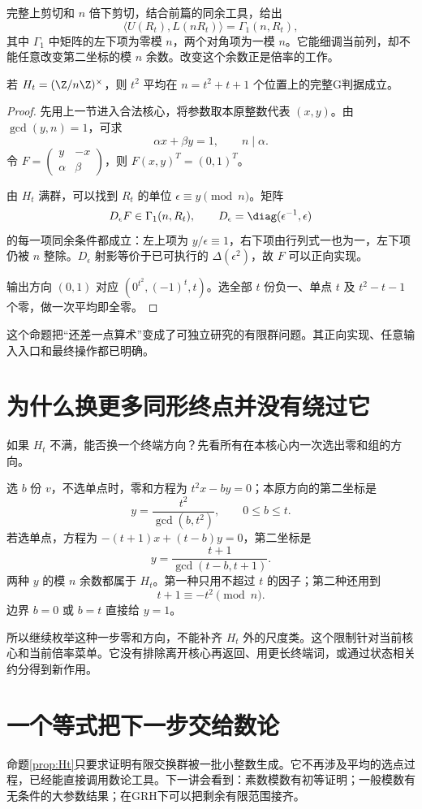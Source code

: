 完整上剪切和 $n$ 倍下剪切，结合前篇的同余工具，给出
\[\langle U(R_t),L(nR_t)\rangle=\Gamma_1(n,R_t),
\]
其中 $\Gamma_1$ 中矩阵的左下项为零模 $n$，两个对角项为一模 $n$。它能细调当前列，却不能任意改变第二坐标的模 $n$ 余数。改变这个余数正是倍率的工作。

\begin{proposition}[平方族的充分算术接口]\label{prop:Ht}
若 $H_t=(\Z/n\Z)^\times$，则 $t^2$ 平均在 $n=t^2+t+1$ 个位置上的完整G判据成立。
\end{proposition}
\begin{proof}
先用上一节进入合法核心，将参数取本原整数代表 $(x,y)$。由 $\gcd(y,n)=1$，可求
\[\alpha x+\beta y=1,\qquad n\mid\alpha.
\]
令 $F=\left(\begin{smallmatrix}y&-x\\\alpha&\beta\end{smallmatrix}\right)$，则 $F(x,y)^T=(0,1)^T$。

由 $H_t$ 满群，可以找到 $R_t$ 的单位 $\epsilon\equiv y\pmod n$。矩阵
\[D_\epsilon F\in\Gamma_1(n,R_t),\qquad
D_\epsilon=\diag(\epsilon^{-1},\epsilon)
\]
的每一项同余条件都成立：左上项为 $y/\epsilon\equiv1$，右下项由行列式一也为一，左下项仍被 $n$ 整除。$D_\epsilon$ 射影等价于已可执行的 $\Delta(\epsilon^2)$，故 $F$ 可以正向实现。

输出方向 $(0,1)$ 对应 $(0^{t^2},(-1)^t,t)$。选全部 $t$ 份负一、单点 $t$ 及 $t^2-t-1$ 个零，做一次平均即全零。
\end{proof}

这个命题把“还差一点算术”变成了可独立研究的有限群问题。其正向实现、任意输入入口和最终操作都已明确。

\section{为什么换更多同形终点并没有绕过它}
如果 $H_t$ 不满，能否换一个终端方向？先看所有在本核心内一次选出零和组的方向。

选 $b$ 份 $v$，不选单点时，零和方程为 $t^2x-by=0$；本原方向的第二坐标是
\[y=\frac{t^2}{\gcd(b,t^2)},\qquad0\le b\le t.
\]
若选单点，方程为 $-(t+1)x+(t-b)y=0$，第二坐标是
\[y=\frac{t+1}{\gcd(t-b,t+1)}.
\]
两种 $y$ 的模 $n$ 余数都属于 $H_t$。第一种只用不超过 $t$ 的因子；第二种还用到
\[t+1\equiv-t^2\pmod n.
\]
边界 $b=0$ 或 $b=t$ 直接给 $y=1$。

所以继续枚举这种一步零和方向，不能补齐 $H_t$ 外的尺度类。这个限制针对当前核心和当前倍率菜单。它没有排除离开核心再返回、用更长终端词，或通过状态相关约分得到新作用。

\section{一个等式把下一步交给数论}
命题\ref{prop:Ht}只要求证明有限交换群被一批小整数生成。它不再涉及平均的选点过程，已经能直接调用数论工具。下一讲会看到：素数模数有初等证明；一般模数有无条件的大参数结果；在GRH下可以把剩余有限范围接齐。
